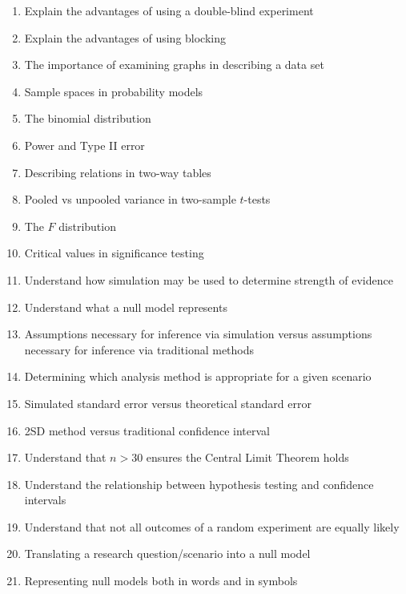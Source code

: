 \documentclass{article}
\begin{document}
\begin{enumerate}
\item Explain the advantages of using a double-blind experiment
\item Explain the advantages of using blocking
\item The importance of examining graphs in describing a data set
\item Sample spaces in probability models
\item The binomial distribution
\item Power and Type II error
\item Describing relations in two-way tables
\item Pooled vs unpooled variance in two-sample $t$-tests
\item The $F$ distribution
\item Critical values in significance testing
\item Understand how simulation may be used to determine strength of evidence
\item Understand what a null model represents
\item Assumptions necessary for inference via simulation versus assumptions necessary for inference via traditional methods
\item Determining which analysis method is appropriate for a given scenario
\item Simulated standard error versus theoretical standard error
\item 2SD method versus traditional confidence interval
\item Understand that $n > 30$ ensures the Central Limit Theorem holds
\item Understand the relationship between hypothesis testing and confidence intervals
\item Understand that not all outcomes of a random experiment are equally likely
\item Translating a research question/scenario into a null model
\item Representing null models both in words and in symbols
\end{enumerate}
\end{document}
